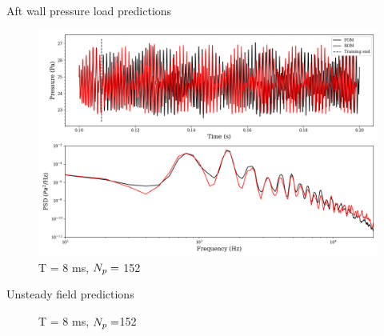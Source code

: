 \documentclass[]{beamer}
\begin{document}
\begin{frame}{Aft wall pressure load predictions}
	\centering
	\begin{figure}
		\includegraphics[width=0.85\linewidth]{experiments/2d_cavity/signalProc_point8_8ms_k152.png}
		\caption*{T = 8 ms, $N_p =$ 152}
	\end{figure}
\end{frame}

\begin{frame}{Unsteady field predictions}
	\begin{figure}
		\begin{minipage}{0.49\linewidth}
		\end{minipage}
		\begin{minipage}{0.49\linewidth}
		\end{minipage}
		\caption*{T = 8 ms, $N_p =$152}
	\end{figure}
\end{frame}
\end{document}
